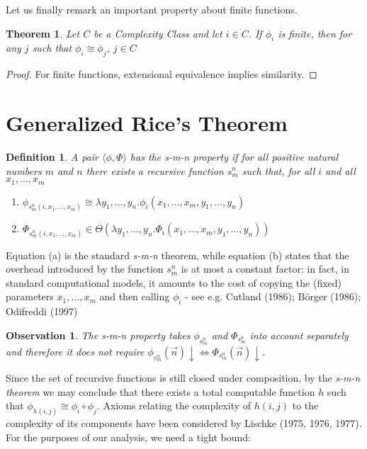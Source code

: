 \documentclass[10pt, a4paper, oneside, titlepage, draft]{article}
\newtheorem{definition}[shrd]{Definition}
\newtheorem{observation}{Observation}[shrd]
\newtheorem{theorem}[shrd]{Theorem}
\begin{document}
Let us finally remark an important property about finite functions.

\begin{theorem}
    Let $C$ be a Complexity Class and let $i \in C$. If $\phi_i$ is finite, then for any $j$ such that $\phi_i \cong \phi_j$, $j \in C$
\end{theorem}

\begin{proof}
    For finite functions, extensional equivalence implies similarity.
\end{proof}

\section{Generalized Rice's Theorem}

\begin{definition}
    A pair $\langle \phi, \Phi \rangle$ has the \emph{s-m-n property} if for all positive natural numbers $m$ and $n$ there exists a recursive function $s_m^n$ such that, for all $i$ and all $x_1, \dots, x_m$ 
    \begin{enumerate}[label=(\alph*)]
        \item $ \phi_{s_m^n (i,x_1,\dots,x_m)} \cong \lambda y_1,\dots,y_n . \phi_i (x_1,\dots,x_m,y_1,\dots,y_n)  $
        \item $ \Phi_{s_m^n (i,x_1,\dots,x_m)} \in  \Theta(\lambda y_1,\dots,y_n . \Phi_i (x_1,\dots,x_m,y_1,\dots,y_n))  $
    \end{enumerate}
\end{definition}

Equation (a) is the standard \emph{s-m-n} theorem, while equation (b) states that the overhead introduced by the function $s_m^n$ is at most a constant factor: in fact, in standard computational models, it amounts to the cost of copying the (fixed) parameters $x_1,\dots,x_m$ and then calling $\phi_i$ - see e.g. Cutland (1986); Börger (1986); Odifreddi (1997)

\begin{observation}
    The s-m-n property takes $\phi_{s_m^n}$ and $\Phi_{s_m^n}$ into account separately and therefore it does not require $\phi_{s_m^n}(\vec{n})\downarrow \iff \Phi_{s_m^n}(\vec{n})\downarrow$.
\end{observation}

Since the set of recursive functions is still closed under composition, by the \emph{s-m-n theorem} we may conclude that there exists a total computable function $h$ such that $\phi_{h(i,j)} \cong \phi_i \circ \phi_j $. Axioms relating the complexity of $h(i,j)$ to the complexity of its components have been considered by Lischke (1975, 1976, 1977). For the purposes of our analysis, we need a tight bound:
\end{document}
